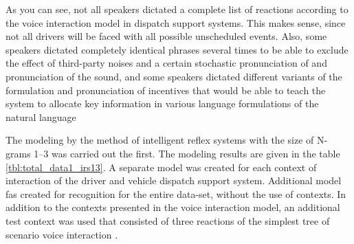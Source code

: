 As you can see, not all speakers dictated a complete list of reactions according to the voice interaction model in dispatch support systems. This makes sense, since not all drivers will be faced with all possible unscheduled events. Also, some speakers dictated completely identical phrases several times to be able to exclude the effect of third-party noises and a certain stochastic pronunciation of and pronunciation of the sound, and some speakers dictated different variants of the formulation and pronunciation of incentives that would be able to teach the system to allocate key information in various language formulations of the natural language

The modeling by the method of intelligent reflex systems with the size of N-grams 1--3 was carried out the first. The modeling results are given in the table \ref{tbl:total_data1_irs13}. A separate model was created for each context of interaction of the driver and vehicle dispatch support system. Additional model fas created for recognition for the entire data-set, without the use of contexts. In addition to the contexts presented in the voice interaction model, an additional test context was used that consisted of three reactions of the simplest tree of scenario voice interaction \cite{eng_art3}.

